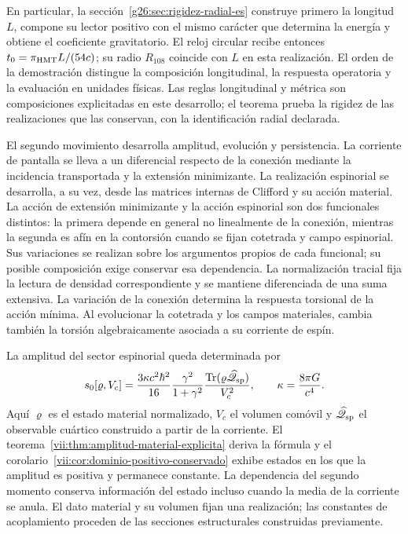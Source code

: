 En particular, la sección~\ref{g26:sec:rigidez-radial-es} construye
primero la longitud \(L\), compone su lector positivo con el mismo
carácter que determina la energía y obtiene el coeficiente gravitatorio.
El reloj circular recibe entonces
\(t_0=\pi_{\rm HMT}L/(54c)\); su radio \(R_{108}\) coincide con
\(L\) en esta realización. El orden de la demostración distingue la
composición longitudinal, la respuesta operatoria y la evaluación en
unidades físicas. Las reglas longitudinal y métrica son composiciones
explicitadas en este desarrollo; el teorema prueba la rigidez de las
realizaciones que las conservan, con la identificación radial declarada.

El segundo movimiento desarrolla amplitud, evolución y persistencia.
La corriente de pantalla se lleva a un diferencial respecto de la
conexión mediante la incidencia transportada y la extensión minimizante.
La realización espinorial se desarrolla, a su vez, desde las matrices
internas de Clifford y su acción material. La acción de extensión
minimizante y la acción espinorial son dos funcionales distintos: la
primera depende en general no linealmente de la conexión, mientras la
segunda es afín en la contorsión cuando se fijan cotetrada y campo
espinorial. Sus variaciones se realizan sobre los argumentos propios de
cada funcional; su posible composición exige conservar esa dependencia.
La normalización tracial
fija la lectura de densidad correspondiente y se mantiene diferenciada de
una suma extensiva. La variación de la conexión determina la respuesta
torsional de la acción mínima. Al evolucionar la cotetrada y los campos
materiales, cambia también la torsión algebraicamente asociada a su
corriente de espín.

La amplitud del sector espinorial queda determinada por
\begin{equation}
 s_0[\varrho,V_c]
 =\frac{3\kappa c^2\hbar^2}{16}
   \frac{\gamma^2}{1+\gamma^2}
   \frac{\operatorname{Tr}
    (\varrho\widehat{\mathscr Q}_{\rm sp})}{V_c^2},
 \qquad \kappa=\frac{8\pi G}{c^4}.
 \label{vii:eq:programa-amplitud}
\end{equation}
Aquí \(\varrho\) es el estado material normalizado, \(V_c\) el volumen
comóvil y \(\widehat{\mathscr Q}_{\rm sp}\) el observable cuártico
construido a partir de la corriente. El
teorema~\ref{vii:thm:amplitud-material-explicita} deriva la fórmula y
el corolario~\ref{vii:cor:dominio-positivo-conservado} exhibe estados
en los que la amplitud es positiva y permanece constante. La dependencia
del segundo momento conserva información del estado incluso cuando la
media de la corriente se anula. El dato material y su volumen fijan una
realización; las constantes de acoplamiento proceden de las secciones
estructurales construidas previamente.

